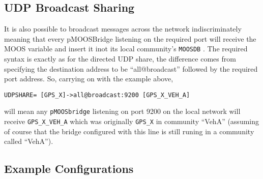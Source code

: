 \documentclass[a4paper,10pt]{article}
\newcommand{\Code}[1]{\texttt{#1} }
\newcommand{\code}[1]{\Code{#1} }
\begin{document}
\subsection{UDP Broadcast Sharing}

It is also possible to broadcast messages across the network indiscriminately meaning that every pMOOSBridge listening on the required port will receive the MOOS variable and insert it inot its local community's  \code{MOOSDB}. The required syntax is exactly as for the directed UDP share, the difference comes from specifying the destination address to be ``all@broadcast'' followed by the required port address. So, carrying on with the example above,
\begin{verbatim}
UDPSHARE= [GPS_X]->all@broadcast:9200 [GPS_X_VEH_A]
\end{verbatim}

will mean any \code{pMOOSbridge} listening on port 9200 on the local network will receive \code{GPS\_X\_VEH\_A}  which was originally  \code{GPS\_X}  in community ``VehA'' (assuming of course that the bridge configured with this line is still runing in a community called ``VehA'').
 



\subsection{Example Configurations}






\end{document}
